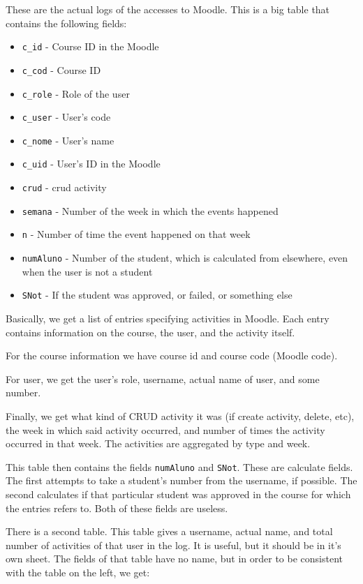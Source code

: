 These are the actual logs of the accesses to Moodle. This is a big table that
contains the following fields:

\begin{itemize}
    \item \texttt{c\_id} - Course ID in the Moodle
    \item \texttt{c\_cod} - Course ID
    \item \texttt{c\_role} - Role of the user
    \item \texttt{c\_user} - User's code
    \item \texttt{c\_nome} - User's name
    \item \texttt{c\_uid} - User's ID in the Moodle
    \item \texttt{crud} - \gls{crud} activity
    \item \texttt{semana} - Number of the week in which the events happened
    \item \texttt{n} - Number of time the event happened on that week
    \item \texttt{numAluno} - Number of the student, which is calculated from
        elsewhere, even when the user is not a student
    \item \texttt{SNot} - If the student was approved, or failed, or something
        else
\end{itemize}

Basically, we get a list of entries specifying activities in Moodle. Each entry
contains information on the course, the user, and the activity itself.

For the course information we have course id and course code (Moodle code).

For user, we get the user's role, username, actual name of user, and some
number.

Finally, we get what kind of CRUD activity it was (if create activity, delete,
etc), the week in which said activity occurred, and number of times the
activity occurred in that week. The activities are aggregated by type and week.

This table then contains the fields \texttt{numAluno} and \texttt{SNot}. These
are calculate fields. The first attempts to take a student's number from the
username, if possible. The second calculates if that particular student was
approved in the course for which the entries refers to. Both of these fields
are useless.

There is a second table. This table gives a username, actual name, and total
number of activities of that user in the log. It is useful, but it should be in
it's own sheet. The fields of that table have no name, but in order to be
consistent with the table on the left, we get:

